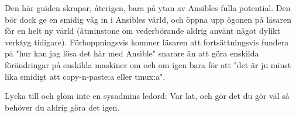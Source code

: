 Den här guiden skrapar, återigen, bara på ytan av Ansibles fulla potential. Den bör dock ge en smidig väg in i
Ansibles värld, och öppna upp ögonen på läsaren för en helt ny värld (åtminstone om vederbörande aldrig använt
något dylikt verktyg tidigare). Förhoppningsvis kommer läsaren att fortsättningsvis fundera på "hur kan jag lösa
det här med Ansible" snarare än att göra enskilda förändringar på enskilda maskiner om och om igen bara för att 
"det är ju minst lika smidigt att copy-n-paste:a eller tmux:a".

Lycka till och glöm inte en sysadmins ledord: Var lat, och gör det du gör väl så behöver du aldrig göra det igen.
